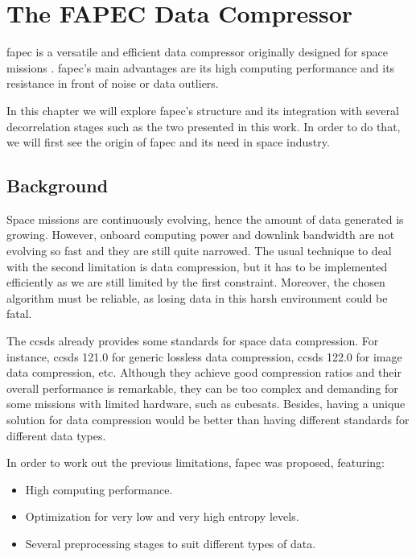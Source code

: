 \chapter{The FAPEC Data Compressor}

\acrfull{fapec} is a versatile and efficient data compressor originally designed for space missions \parencite{PaperFAPEC}. \acrshort{fapec}'s main advantages are its high computing performance and its resistance in front of noise or data outliers.

In this chapter we will explore \acrshort{fapec}'s structure and its integration with several decorrelation stages such as the two presented in this work. In order to do that, we will first see the origin of \acrshort{fapec} and its need in space industry.

\section{Background}
Space missions are continuously evolving, hence the amount of data generated is growing. However, onboard computing power and downlink bandwidth are not evolving so fast and they are still quite narrowed. The usual technique to deal with the second limitation is data compression, but it has to be implemented efficiently as we are still limited by the first constraint. Moreover, the chosen algorithm must be reliable, as losing data in this harsh environment could be fatal.

The \acrfull{ccsds} already provides some standards for space data compression. For instance, \acrshort{ccsds} 121.0 for generic lossless data compression, \acrshort{ccsds} 122.0 \parencite{ccsds122} for image data compression, etc. Although they achieve good compression ratios and their overall performance is remarkable, they can be too complex and demanding for some missions with limited hardware, such as cubesats. Besides, having a unique solution for data compression would be better than having different standards for different data types.

In order to work out the previous limitations, \acrshort{fapec} was proposed, featuring:
\begin{itemize}
	\item High computing performance.
	\item Optimization for very low and very high entropy levels.
	\item Several preprocessing stages to suit different types of data.
\end{itemize}

